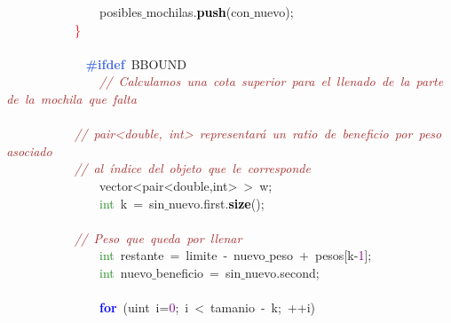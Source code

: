 \mbox{}\ \ \ \ \ \ \ \ \ \ \ \ \ \ \ \ posibles$\_$mochilas\textcolor{BrickRed}{.}\textbf{\textcolor{Black}{push}}\textcolor{BrickRed}{(}con$\_$nuevo\textcolor{BrickRed}{);} \\
\mbox{}\ \ \ \ \ \ \ \ \ \ \ \ \textcolor{Red}{\}} \\
\mbox{} \\
\mbox{}\textbf{\textcolor{RoyalBlue}{\ \ \ \ \ \ \ \ \ \ \ \ \#ifdef}}\ BBOUND \\
\mbox{}\ \ \ \ \ \ \ \ \ \ \ \ \ \ \ \ \textit{\textcolor{Brown}{//\ Calculamos\ una\ cota\ superior\ para\ el\ llenado\ de\ la\ parte\ de\ la\ mochila\ que\ falta}} \\
\mbox{} \\
\mbox{}\ \ \ \ \ \ \ \ \ \ \ \ \textit{\textcolor{Brown}{//\ pair\textless{}double,\ int\textgreater{}\ representará\ un\ ratio\ de\ beneficio\ por\ peso\ asociado}} \\
\mbox{}\ \ \ \ \ \ \ \ \ \ \ \ \textit{\textcolor{Brown}{//\ al\ índice\ del\ objeto\ que\ le\ corresponde}} \\
\mbox{}\ \ \ \ \ \ \ \ \ \ \ \ \ \ \ \ \textcolor{TealBlue}{vector\textless{}pair\textless{}double,int\textgreater{}\ \textgreater{}}\ w\textcolor{BrickRed}{;} \\
\mbox{}\ \ \ \ \ \ \ \ \ \ \ \ \ \ \ \ \textcolor{ForestGreen}{int}\ k\ \textcolor{BrickRed}{=}\ sin$\_$nuevo\textcolor{BrickRed}{.}first\textcolor{BrickRed}{.}\textbf{\textcolor{Black}{size}}\textcolor{BrickRed}{();} \\
\mbox{} \\
\mbox{}\ \ \ \ \ \ \ \ \ \ \ \ \textit{\textcolor{Brown}{//\ Peso\ que\ queda\ por\ llenar}} \\
\mbox{}\ \ \ \ \ \ \ \ \ \ \ \ \ \ \ \ \textcolor{ForestGreen}{int}\ restante\ \textcolor{BrickRed}{=}\ limite\ \textcolor{BrickRed}{-}\ nuevo$\_$peso\ \textcolor{BrickRed}{+}\ pesos\textcolor{BrickRed}{[}k\textcolor{BrickRed}{-}\textcolor{Purple}{1}\textcolor{BrickRed}{];} \\
\mbox{}\ \ \ \ \ \ \ \ \ \ \ \ \ \ \ \ \textcolor{ForestGreen}{int}\ nuevo$\_$beneficio\ \textcolor{BrickRed}{=}\ sin$\_$nuevo\textcolor{BrickRed}{.}second\textcolor{BrickRed}{;} \\
\mbox{} \\
\mbox{}\ \ \ \ \ \ \ \ \ \ \ \ \ \ \ \ \textbf{\textcolor{Blue}{for}}\ \textcolor{BrickRed}{(}\textcolor{TealBlue}{uint}\ i\textcolor{BrickRed}{=}\textcolor{Purple}{0}\textcolor{BrickRed}{;}\ i\ \textcolor{BrickRed}{\textless{}}\ tamanio\ \textcolor{BrickRed}{-}\ k\textcolor{BrickRed}{;}\ \textcolor{BrickRed}{++}i\textcolor{BrickRed}{)} \\
